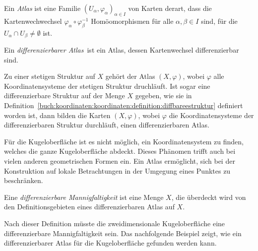 \begin{definition}[Atlas]
Ein \emph{Atlas} ist eine Familie $(U_\alpha,\varphi_\alpha)_{\alpha\in I}$
%
von Karten derart, dass die Kartenwechwechsel
$\varphi_\alpha\circ\varphi_\beta^{-1}$ Homöomorphismen
für alle $\alpha,\beta\in I$ sind, für die
$U_\alpha\cap U_\beta\ne \emptyset$ ist.
\end{definition}

\begin{definition}
Ein \emph{differenzierbarer Atlas} ist ein Atlas, dessen
%
Kartenwechsel differenzierbar sind.
\end{definition}

Zu einer stetigen Struktur auf $X$ gehört der Atlas $(X,\varphi)$,
wobei $\varphi$ alle Koordinatensysteme der stetigen Struktur druchläuft.
Ist sogar eine differenzierbare Struktur auf der Menge $X$ gegeben,
wie sie in
Definition~\ref{buch:koordinaten:koordinaten:definition:diffbareestruktur}
definiert worden ist, dann bilden die Karten $(X,\varphi)$, wobei
$\varphi$ die Koordinatensysteme der differenzierbaren Struktur
durchläuft, einen differenzierbaren Atlas.

Für die Kugeloberfläche ist es nicht möglich, ein Koordinatensystem
zu finden, welches die ganze Kugeloberfläche abdeckt.
%
Dieses Phänomen trifft auch bei vielen anderen geometrischen Formen ein.
Ein Atlas ermöglicht, sich bei der Konstruktion auf lokale Betrachtungen
in der Umgegung eines Punktes zu beschränken.

\begin{definition}
Eine {\em differenzierbare Mannigfaltigkeit} ist eine Menge $X$, die überdeckt
wird von den Definitionsgebieten eines differenzierbaren Atlas auf $X$.
%
%
\end{definition}

Nach dieser Definition müsste die zweidimensionale Kugeloberfläche eine
differenzierbare Mannigfaltigkeit sein.
Das nachfolgende Beispiel zeigt, wie ein differenzierbarer Atlas
für die Kugeloberfläche gefunden werden kann.

